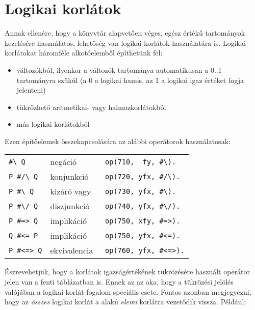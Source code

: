 \section{Logikai korlátok}

Annak ellenére, hogy a \clpfd könyvtár alapvetően véges, egész értékű tartományok 
kezelésére használatos, lehetőség van logikai korlátok használatára is. Logikai
korlátokat háromféle alkotóelemből építhetünk fel:

\begin{itemize}
\item változókból, ilyenkor a változók tartománya automatikusan a 0..1 tartományra
szűkül (a 0 a logikai hamis, az 1 a logikai igaz értéket fogja jelenteni)
\item tükrözhető aritmetikai- vagy halmazkorlátokból
\item más logikai korlátokból
\end{itemize}

Ezen építőelemek összekapcsolására az alábbi operátorok használatosak:

\begin{center}\begin{tabular}{|l|l|l|}
\hline
\verb'#\ Q'     &           negáció\ \ \ \ \ & \verb'op(710,  fy, #\).'\\
\verb'P #/\ Q'  &           konjunkció       & \verb'op(720, yfx, #/\).'\\
\verb'P #\ Q'   &           kizáró vagy      & \verb'op(730, yfx, #\).'\\
\verb'P #\/ Q'  &           diszjunkció      & \verb'op(740, yfx, #\/).'\\
\verb'P #=> Q'  &           implikáció       & \verb'op(750, xfy, #=>).'\\
\verb'Q #<= P'  &           implikáció       & \verb'op(750, yfx, #<=).'\\
\verb'P #<=> Q' &           ekvivalencia     & \verb'op(760, yfx, #<=>).'\\
\hline
\end{tabular}\end{center}

Észrevehetjük, hogy a korlátok igazságértékének tükrözésére használt \cd{\#<=>}
operátor jelen van a fenti táblázatban is. Ennek az az oka, hogy a tükrözési
jelölés valójában a logikai korlát-fogalom speciális esete. Fontos azonban megjegyezni,
hogy az \emph{összes} logikai korlát a  alakú \emph{elemi}
korlátra vezetődik vissza. Például:

\begin{center}
\end{center}

